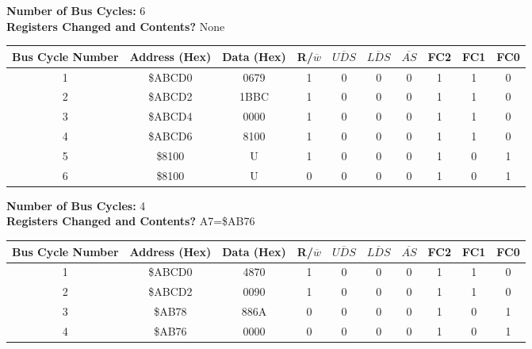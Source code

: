 \documentclass[12pt]{article}
\begin{document}
\noindent\textbf{Number of Bus Cycles: }6\\
\textbf{Registers Changed and Contents? }None
\begin{table}[H]
	\centering
	\begin{adjustbox}{max width=\textwidth}
	\begin{tabulary}{1.1\textwidth}{|c|c|c|c|c|c|c|c|c|c|}
		\hline
		\textbf{Bus Cycle Number}	&	\textbf{Address (Hex)}	&	\textbf{Data (Hex)}	&	R/$\overline{w}$	&	$\overline{UDS}$	&	$\overline{LDS}$	&	$\overline{AS}$	&	FC2	&	FC1	&	FC0 \\ \hline
		
		1	&	\$ABCD0	&	0679	&	1	&	0	&	0	&	0	&	1	&	1	&	0	\\	\hline
		
		2	&	\$ABCD2	&	1BBC	&	1	&	0	&	0	&	0	&	1	&	1	&	0	\\	\hline
		
		3	&	\$ABCD4	&	0000	&	1	&	0	&	0	&	0	&	1	&	1	&	0	\\ \hline
		
		4	&	\$ABCD6	&	8100	&	1	&	0	&	0	&	0	&	1	&	1	&	0	\\ \hline
		
		5	&	\$8100	&	U	&	1	&	0	&	0	&	0	&	1	&	0	&	1	\\ \hline
		
		6	&	\$8100	&	U	&	0	&	0	&	0	&	0	&	1	&	0	&	1	\\ \hline
		\end{tabulary}
	\end{adjustbox}
\end{table}

\noindent\textbf{Number of Bus Cycles: }4\\
\textbf{Registers Changed and Contents? }A7=\$AB76
\begin{table}[H]
	\centering
	\begin{adjustbox}{max width=\textwidth}
	\begin{tabulary}{1.1\textwidth}{|c|c|c|c|c|c|c|c|c|c|}
		\hline
		\textbf{Bus Cycle Number}	&	\textbf{Address (Hex)}	&	\textbf{Data (Hex)}	&	R/$\overline{w}$	&	$\overline{UDS}$	&	$\overline{LDS}$	&	$\overline{AS}$	&	FC2	&	FC1	& FC0 \\ \hline
		
		1	&	\$ABCD0	&	4870	&	1	&	0	&	0	&	0	&	1	&	1	&	0	\\	\hline
		
		2	&	\$ABCD2	&	0090	&	1	&	0	&	0	&	0	&	1	&	1	&	0	\\	\hline
		
		3	&	\$AB78	&	886A	&	0	&	0	&	0	&	0	&	1	&	0	&	1	\\ \hline
		
		4	&	\$AB76	&	0000	&	0	&	0	&	0	&	0	&	1	&	0	&	1	\\ \hline
		
		\end{tabulary}
	\end{adjustbox}
\end{table}
\end{document}
